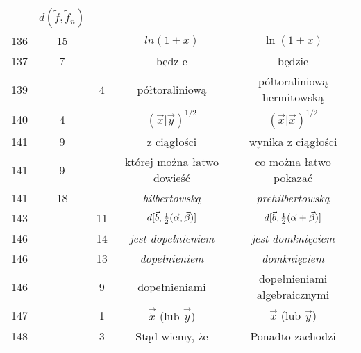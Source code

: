 \documentclass[a4paper,11pt]{article}
\begin{document}
\begin{center}
\begin{tabular}{|c|c|c|c|c|}
           & $d( \tilde{ f }, \tilde{ f }_{ n } )$ \\
    136 & 15 & & $ln( 1 + x )$ & $\ln( 1 + x )$ \\
    137 &  7 & & będz e & będzie \\
    139 & &  4 & półtoraliniową & półtoraliniową hermitowską \\
    140 &  4 & & $( \vec{ x } | \vec{ y } )^{ 1 / 2 }$
           & $( \vec{ x } | \vec{ x } )^{ 1 / 2 }$ \\
    141 &  9 & & z ciągłości & wynika z ciągłości \\
    141 &  9 & & której można łatwo dowieść & co można łatwo pokazać \\
    141 & 18 & & \emph{hilbertowską} & \emph{prehilbertowską} \\
    143 & & 11 & $d[ \vec{ b }, \frac{ 1 }{ 2 } ( \vec{ \alpha }, \vec{ \beta }) ]$
           & $d[ \vec{ b }, \frac{ 1 }{ 2 } ( \vec{ \alpha } + \vec{ \beta }) ]$
    \\
    146 & & 14 & \emph{jest dopełnieniem} & \emph{jest domknięciem} \\
    146 & & 13 & \emph{dopełnieniem} & \emph{domknięciem} \\
    146 & &  9 & dopełnieniami & dopełnieniami algebraicznymi \\
    147 & &  1 & $\vec{ \dot{ x } }$ (lub $\vec{ \dot{ y } }$)
           & $\vec{ x }$ (lub $\vec{ y }$) \\
    148 & &  3 & Stąd wiemy, że & Ponadto zachodzi \\
    \hline
  \end{tabular}


\end{center}
\end{document}
